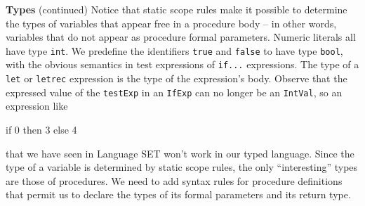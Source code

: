 \begin{minipage}[t]{\sw}
\slidenumber
\LARGE
{\bf Types} (continued)\exx
Notice that static scope rules make it possible to determine
the types of variables that appear free in a procedure body --
in other words, variables that do not appear
as procedure formal parameters.\exx
Numeric literals all have type \verb'int'.
We predefine the identifiers \verb'true' and \verb'false'
to have type \verb'bool',
with the obvious semantics
in test expressions of \verb'if...' expressions.\exx
The type of a \verb'let' or \verb'letrec' expression
is the type of the expression's body.\exx
Observe that the expressed value
of the \verb'testExp' in an \verb'IfExp'
can no longer be an \verb'IntVal',
so an expression like
{\Large
\begin{qv}
if 0 then 3 else 4
\end{qv}
}
that we have seen in Language SET
won't work in our typed language.\exx
Since the type of a variable is determined by static scope rules,
the only ``interesting'' types are those of procedures.
We need to add syntax rules for procedure definitions
that permit us to declare
the types of its formal parameters and its return type.
\end{minipage}

